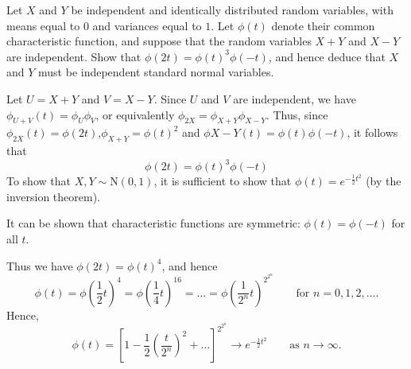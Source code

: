\begin{exercise}
\begin{questions}
\question
Let $X$ and $Y$ be independent and identically distributed random variables, with means equal to $0$ and variances equal to $1$. Let $\phi(t)$ denote their common characteristic function, and suppose that the random variables $X+Y$ and $X-Y$ are independent. Show that $\phi(2t)=\phi(t)^3\phi(-t)$, and hence deduce that $X$ and $Y$ must be independent standard normal variables.

\begin{answer}
Let $U=X+Y$ and $V=X-Y$. Since $U$ and $V$ are independent, we have $\phi_{U+V}(t)=\phi_U\phi_V$, or equivalently $\phi_{2X}=\phi_{X+Y}\phi_{X-Y}$. Thus, since $\phi_{2X}(t)=\phi(2t)$,$\phi_{X+Y}=\phi(t)^2$ and $\phi{X-Y}(t) = \phi(t)\phi(-t)$, it follows that
\[
\phi(2t) = \phi(t)^3\phi(-t)
\]
To show that $X,Y\sim\text{N}(0,1)$, it is sufficient to show that $\phi(t) = e^{-\frac{1}{2}t^2}$ (by the inversion theorem).

It can be shown that characteristic functions are symmetric: $\phi(t)=\phi(-t)$ for all $t$. 

Thus we have $\phi(2t)=\phi(t)^4$, and hence
\[
\phi(t) 
	= \phi\left(\frac{1}{2}t\right)^4 
	= \phi\left(\frac{1}{4}t\right)^{16} 
	= \ldots 
	= \phi\left(\frac{1}{2^n}t\right)^{2^{2^n}} \qquad\text{for $n=0,1,2,\ldots$}.
\]
Hence,	
\[
\phi(t) 
	= \left[1 - \frac{1}{2}\left(\frac{t}{2^n}\right)^2 + \ldots\right]^{2^{2^n}} 
	\to e^{-\frac{1}{2}t^2} \qquad\text{as $n\to\infty$.}
\]
\end{answer}



\end{questions}
\end{exercise}
